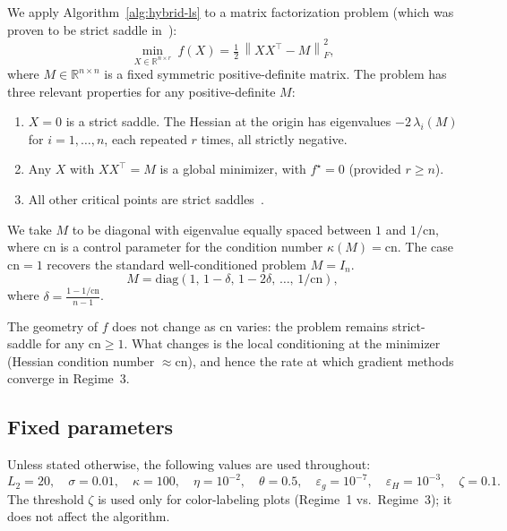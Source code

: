 \documentclass[11pt,a4paper]{article}
\theoremstyle{plain}
\theoremstyle{definition}
\newcommand{\R}{\mathbb{R}}
\newcommand{\norm}[1]{\left\|#1\right\|}
\newcommand{\epsg}{\varepsilon_{g}}
\newcommand{\epsH}{\varepsilon_{H}}
\newcommand{\Ltwo}{L_{2}}
\begin{document}
We apply Algorithm~\ref{alg:hybrid-ls} to a matrix factorization problem (which was proven to be strict saddle in~\cite{bhojanapalli2016global}):
\begin{equation}\label{eq:matfact}
  \min_{X \in \R^{n \times r}}\ f(X) = \tfrac{1}{2}\,\norm{X X^\top - M}_F^2,
\end{equation}
where $M \in \R^{n \times n}$ is a fixed symmetric positive-definite matrix. The problem has three relevant properties for any positive-definite $M$:
\begin{enumerate}[leftmargin=2em]
  \item $X = 0$ is a strict saddle. The Hessian at the origin has eigenvalues $-2\,\lambda_i(M)$ for $i = 1, \ldots, n$, each repeated $r$ times, all strictly negative.
  \item Any $X$ with $X X^\top = M$ is a global minimizer, with $f^\star = 0$ (provided $r \geq n$).
  \item All other critical points are strict saddles~\cite{pmlr-v70-ge17a}.
\end{enumerate}
We take $M$ to be diagonal with eigenvalue equally spaced between $1$ and $1/\mathrm{cn}$,
where $\mathrm{cn}$ is a control parameter for the condition number $\kappa(M) = \mathrm{cn}$. The 
case $\mathrm{cn} = 1$ recovers the standard well-conditioned problem $M = I_n$. 
\begin{equation}\label{eq:M}
  M = \mathrm{diag}\!\left(1,\, 1-\delta,\, 1-2\delta,\, \ldots,\, 1/\mathrm{cn}\right),
\end{equation}
where $\delta = \frac{1 - 1/\mathrm{cn}}{n-1}$.

The geometry of $f$ does not change
as $\mathrm{cn}$ varies: the problem remains strict-saddle for any 
$\mathrm{cn} \geq 1$. What changes is the local conditioning at the 
minimizer (Hessian condition number $\approx \mathrm{cn}$), and hence 
the rate at which gradient methods converge in Regime~3.

\subsection{Fixed parameters}

Unless stated otherwise, the following values are used throughout:
\[
  \Ltwo = 20,\quad
  \sigma = 0.01,\quad
  \kappa = 100,\quad
  \eta = 10^{-2},\quad
  \theta = 0.5,\quad
  \epsg = 10^{-7},\quad
  \epsH = 10^{-3},\quad
  \zeta = 0.1.
\]
The threshold $\zeta$ is used only for color-labeling plots (Regime~1 vs.\ Regime~3); it does not affect the algorithm.
\end{document}
